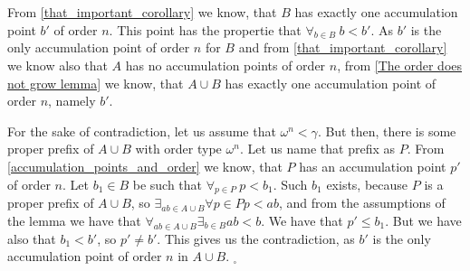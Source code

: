 From \ref{that_important_corollary} we know, that $B$ has exactly one accumulation point $b'$ of 
order $n$. This point has the propertie that $\forall_{b\in B}\ b<b'$.
As $b'$ is the only accumulation point of 
order $n$ for $B$ and from \ref{that_important_corollary} we know also that 
$A$ has no accumulation points of order $n$, from \ref{The order does not grow lemma} we know, 
that $A\cup B$ has exactly one accumulation point of order $n$, namely $b'$. 


For the sake of contradiction, let us assume that $\omega^n < \gamma$. But then, 
there is some proper prefix of $A\cup B$ with order type $\omega^n$. Let us name that 
prefix as $P$. From \ref{accumulation_points_and_order} we know, that 
$P$ has an accumulation point $p'$ of order $n$. 
Let $b_1 \in B$ be such that $\forall_{p \in P}\ p<b_1$. Such $b_1$ exists, because $P$ is 
a proper prefix of $A\cup B$, so $\exists_{a\!\!\!b\in A\cup B}\forall{p\in P} p < a\!\!\!b$, and 
from the assumptions of the lemma we have that 
$\forall_{a\!\!\!b \in A\cup B}\exists_{b \in B} a\!\!\!b < b$.
We have that $p' \leq b_1$. But we have also that $b_1 < b'$, so $p' \neq b'$. This gives us the 
contradiction, as $b'$ is the only accumulation point of order $n$ in $A\cup B$. $_\square$






